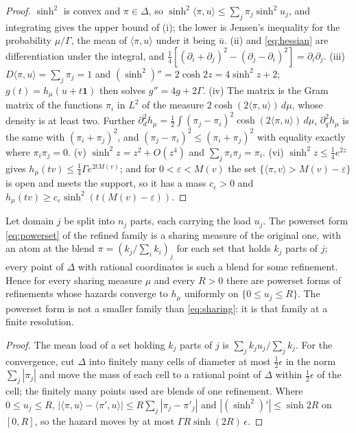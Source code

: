 \begin{proof}
$\sinh^2$ is convex and $\pi\in\Delta$, so
$\sinh^2\langle\pi,u\rangle\le\sum_j\pi_j\sinh^2u_j$, and integrating
gives the upper bound of (i); the lower is Jensen's inequality for the
probability $\mu/\Gamma$, the mean of $\langle\pi,u\rangle$ under it
being $\bar u$. (ii) and \eqref{eq:hessian} are differentiation under the
integral, and
$\tfrac14[(\partial_i+\partial_j)^2-(\partial_j-\partial_i)^2]=\partial_i\partial_j$.
(iii) $D\langle\pi,u\rangle=\sum_j\pi_j=1$ and
$(\sinh^2)''=2\cosh2z=4\sinh^2z+2$; $g(t)=h_\mu(u+t\mathbf 1)$ then solves
$g''=4g+2\Gamma$. (iv) The matrix is the Gram matrix of the functions
$\pi_i$ in $L^2$ of the measure $2\cosh(2\langle\pi,u\rangle)\,d\mu$,
whose density is at least two. Further
$\partial_d^2h_\mu=\tfrac12\int(\pi_j-\pi_i)^2\cosh(2\langle\pi,u\rangle)\,d\mu$,
$\partial_q^2h_\mu$ is the same with $(\pi_i+\pi_j)^2$, and
$(\pi_j-\pi_i)^2\le(\pi_i+\pi_j)^2$ with equality exactly where
$\pi_i\pi_j=0$. (v) $\sinh^2z=z^2+O(z^4)$ and $\sum_j\pi_i\pi_j=\pi_i$.
(vi) $\sinh^2z\le\tfrac14e^{2z}$ gives
$h_\mu(tv)\le\tfrac14\Gamma e^{2tM(v)}$; and for $0<\varepsilon<M(v)$ the
set $\{\langle\pi,v\rangle>M(v)-\varepsilon\}$ is open and meets the
support, so it has a mass $c_\varepsilon>0$ and
$h_\mu(tv)\ge c_\varepsilon\sinh^2(t(M(v)-\varepsilon))$.
\end{proof}

\begin{proposition}\label{prop:refine}
Let domain $j$ be split into $n_j$ parts, each carrying the load $u_j$.
The powerset form \eqref{eq:powerset} of the refined family is a sharing
measure of the original one, with an atom at the blend
$\pi=(k_j/\sum_ik_i)_j$ for each set that holds $k_j$ parts of $j$; every
point of $\Delta$ with rational coordinates is such a blend for some
refinement. Hence for every sharing measure $\mu$ and every $R>0$ there
are powerset forms of refinements whose hazards converge to $h_\mu$
uniformly on $\{0\le u_j\le R\}$. The powerset form is not a smaller
family than \eqref{eq:sharing}: it is that family at a finite resolution.
\end{proposition}

\begin{proof}
The mean load of a set holding $k_j$ parts of $j$ is
$\sum_jk_ju_j/\sum_jk_j$. For the convergence, cut $\Delta$ into finitely
many cells of diameter at most $\tfrac12\epsilon$ in the norm
$\sum_j|\pi_j|$ and move the mass of each cell to a rational point of
$\Delta$ within $\tfrac12\epsilon$ of the cell; the finitely many points
used are blends of one refinement. Where
$0\le u_j\le R$, $|\langle\pi,u\rangle-\langle\pi',u\rangle|\le
R\sum_j|\pi_j-\pi'_j|$ and $|(\sinh^2)'|\le\sinh2R$ on $[0,R]$, so the
hazard moves by at most $\Gamma R\sinh(2R)\,\epsilon$.
\end{proof}

